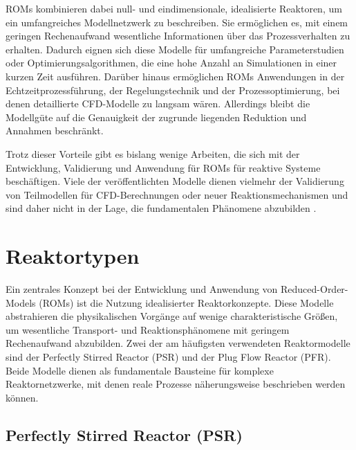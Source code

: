         ROMs kombinieren dabei null- und eindimensionale, idealisierte Reaktoren, um ein umfangreiches Modellnetzwerk zu beschreiben. Sie ermöglichen es, mit einem geringen Rechenaufwand wesentliche Informationen über das Prozessverhalten zu erhalten. Dadurch eignen sich diese Modelle für umfangreiche Parameterstudien oder Optimierungsalgorithmen, die eine hohe Anzahl an Simulationen in einer kurzen Zeit ausführen. Darüber hinaus ermöglichen ROMs Anwendungen in der Echtzeitprozessführung, der Regelungstechnik und der Prozessoptimierung, bei denen detaillierte CFD-Modelle zu langsam wären. Allerdings bleibt die Modellgüte auf die Genauigkeit der zugrunde liegenden Reduktion und Annahmen beschränkt.

        Trotz dieser Vorteile gibt es bislang wenige Arbeiten, die sich mit der Entwicklung, Validierung und Anwendung für ROMs für reaktive Systeme beschäftigen. Viele der veröffentlichten Modelle dienen vielmehr der Validierung von Teilmodellen für CFD-Berech\-nungen oder neuer Reaktionsmechanismen und sind daher nicht in der Lage, die fundamentalen Phänomene abzubilden \cite{VOLOSHCHUK2022117620}.
    \section{Reaktortypen}

        Ein zentrales Konzept bei der Entwicklung und Anwendung von Reduced-Order-Models (ROMs) ist die Nutzung idealisierter Reaktorkonzepte. Diese Modelle abstrahieren die physikalischen Vorgänge auf wenige charakteristische Größen, um wesentliche Transport- und Reaktionsphänomene mit geringem Rechenaufwand abzubilden. Zwei der am häufigsten verwendeten Reaktormodelle sind der Perfectly Stirred Reactor (PSR) und der Plug Flow Reactor (PFR). Beide Modelle dienen als fundamentale Bausteine für komplexe Reaktornetzwerke, mit denen reale Prozesse näherungsweise beschrieben werden können.
        
        \subsection{Perfectly Stirred Reactor (PSR)}

